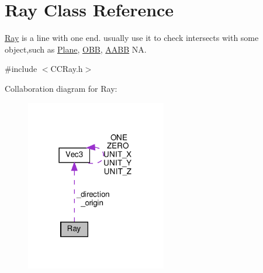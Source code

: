\hypertarget{classRay}{}\section{Ray Class Reference}
\label{classRay}


\hyperlink{classRay}{Ray} is a line with one end. usually use it to check intersects with some object,such as \hyperlink{classPlane}{Plane}, \hyperlink{classOBB}{O\+BB}, \hyperlink{classAABB}{A\+A\+BB}  NA.  




{\ttfamily \#include $<$C\+C\+Ray.\+h$>$}



Collaboration diagram for Ray\+:
\nopagebreak
\begin{figure}[H]
\begin{center}
\leavevmode
\includegraphics[width=174pt]{classRay__coll__graph}
\end{center}
\end{figure}
